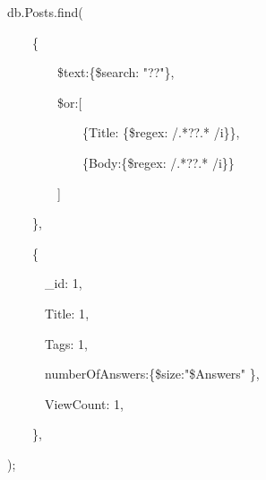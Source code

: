 \textcolor{mydark}{db.Posts.find(}\par
~~~~\textcolor{mydark}{\{}\par
~~~~~~~~\textcolor{mybrown}{\$text}\textcolor{mydark}{:\{}\textcolor{mybrown}{\$search}: \textcolor{mygreen}{"??"}\textcolor{mydark}{\},}\par
~~~~~~~~\textcolor{mybrown}{\$or}\textcolor{mydark}{:[}\par
~~~~~~~~~~~~\textcolor{mydark}{\{Title: \{}\textcolor{mybrown}{\$regex}: \textcolor{mygreen}{/.*??.* /i}\textcolor{mydark}{\}\},}\par
~~~~~~~~~~~~\textcolor{mydark}{\{Body:\{}\textcolor{mybrown}{\$regex}: \textcolor{mygreen}{/.*??.* /i}\textcolor{mydark}{\}\}}\par
~~~~~~~~\textcolor{mydark}{]}\par
~~~~\textcolor{mydark}{\},}\par
~~~~\textcolor{mydark}{\{}\par
~~~~~~\textcolor{mydark}{\_id:}\textcolor{mygreen}{ 1}\textcolor{mydark}{,}\par
~~~~~~\textcolor{mydark}{Title:}\textcolor{mygreen}{ 1}\textcolor{mydark}{,}\par
~~~~~~\textcolor{mydark}{Tags:}\textcolor{mygreen}{ 1}\textcolor{mydark}{,}\par
~~~~~~\textcolor{mydark}{numberOfAnswers:\{}\textcolor{mybrown}{\$size}:\textcolor{mygreen}{"\$Answers" }\textcolor{mydark}{\},}\par
~~~~~~\textcolor{mydark}{ViewCount:}\textcolor{mygreen}{ 1}\textcolor{mydark}{,}\par
~~~~\textcolor{mydark}{\},}\par
\textcolor{mydark}{);}
